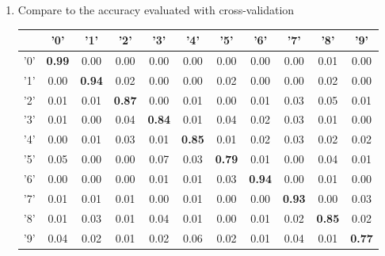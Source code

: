 \documentclass[12pt]{article}
\begin{document}
\begin{enumerate}
	\item Compare to the accuracy evaluated with cross-validation
	\begin{center}
	\begin{tabular}{|c|c|c|c|c|c|c|c|c|c|c|}
		\hline
		\diaghead{\theadfont Diag ColumnmnHead II}{truth}{result} 
		& '0' & '1' & '2' & '3' & '4' & '5' & '6' & '7' & '8' & '9' \\
		\hline
		'0' & {\bf 0.99} & 0.00 & 0.00 & 0.00 & 0.00 & 0.00 & 0.00 & 0.00 & 0.01 & 0.00 \\ 
		\hline
		'1' & 0.00 & {\bf 0.94} & 0.02 & 0.00 & 0.00 & 0.02 & 0.00 & 0.00 & 0.02 & 0.00 \\ 
		\hline
		'2' & 0.01 & 0.01 & {\bf 0.87} & 0.00 & 0.01 & 0.00 & 0.01 & 0.03 & 0.05 & 0.01 \\ 
		\hline
		'3' & 0.01 & 0.00 & 0.04 & {\bf 0.84} & 0.01 & 0.04 & 0.02 & 0.03 & 0.01 & 0.00 \\ 
		\hline
		'4' & 0.00 & 0.01 & 0.03 & 0.01 & {\bf 0.85} & 0.01 & 0.02 & 0.03 & 0.02 & 0.02 \\ 
		\hline
		'5' & 0.05 & 0.00 & 0.00 & 0.07 & 0.03 & {\bf 0.79} & 0.01 & 0.00 & 0.04 & 0.01 \\ 
		\hline
		'6' & 0.00 & 0.00 & 0.00 & 0.01 & 0.01 & 0.03 & {\bf 0.94} & 0.00 & 0.01 & 0.00 \\ 
		\hline
		'7' & 0.01 & 0.01 & 0.01 & 0.00 & 0.01 & 0.00 & 0.00 & {\bf 0.93} & 0.00 & 0.03 \\ 
		\hline
		'8' & 0.01 & 0.03 & 0.01 & 0.04 & 0.01 & 0.00 & 0.01 & 0.02 & {\bf 0.85} & 0.02 \\ 
		\hline
		'9' & 0.04 & 0.02 & 0.01 & 0.02 & 0.06 & 0.02 & 0.01 & 0.04 & 0.01 & {\bf 0.77} \\ 
		\hline
	\end{tabular}
	\end{center}


\end{enumerate}
\end{document}
